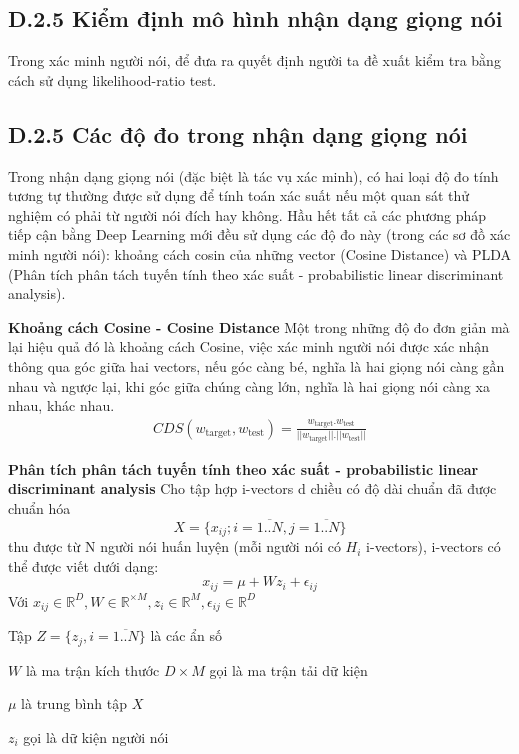 \documentclass{article}
\begin{document}
	\subsection{D.2.5 Kiểm định mô hình nhận dạng giọng nói}
	Trong xác minh người nói, để đưa ra quyết định người ta đề xuất kiểm tra bằng cách sử dụng likelihood-ratio test.

	\subsection{D.2.5 Các độ đo trong nhận dạng giọng nói}
	
	Trong nhận dạng giọng nói (đặc biệt là tác vụ xác minh), có hai loại độ đo tính tương tự thường được sử dụng để tính toán xác suất nếu một quan sát thử nghiệm có phải từ người nói đích hay không. Hầu hết tất cả các phương pháp tiếp cận bằng Deep Learning mới đều sử dụng các độ đo này (trong các sơ đồ xác minh người nói): khoảng cách cosin của những vector (Cosine Distance) và PLDA (Phân tích phân tách tuyến tính theo xác suất - probabilistic linear discriminant analysis).
	
	\textbf{Khoảng cách Cosine - Cosine Distance}
	Một trong những độ đo đơn giản mà lại hiệu quả đó là khoảng cách Cosine, việc xác minh người nói được xác nhận thông qua góc giữa hai vectors, nếu góc càng bé, nghĩa là hai giọng nói càng gần nhau và ngược lại, khi góc giữa chúng càng lớn, nghĩa là hai giọng nói càng xa nhau, khác nhau.
	\begin{align*}
		CDS(w_{\text{target}}, w_{\text{test}}) = \frac{w_{\text{target}}.w_{\text{test}}}{||w_{\text{target}}||.||w_{\text{test}}||}
	\end{align*}
	
	\textbf{Phân tích phân tách tuyến tính theo xác suất - probabilistic linear discriminant analysis}
	Cho tập hợp i-vectors d chiều có độ dài chuẩn đã được chuẩn hóa 
	$$X = \{x_{ij}; i = \overline{1..N}, j = \overline{1..N}\}$$ thu được từ N người nói huấn luyện (mỗi người nói có $H_{i}$ i-vectors), i-vectors có thể được viết dưới dạng:
	$$x_{ij} = \mu + Wz_{i} + \epsilon_{ij}$$
	Với $x_{ij} \in \mathbb{R}^{D}, W \in \mathbb{R}^{ \times M}, z_{i} \in \mathbb{R}^{M}, \epsilon_{ij} \in \mathbb{R}^{D}$
	
	Tập $Z=\{z_{j}, i = \overline{1..N}\}$ là các ẩn số
	
	$W$ là ma trận kích thước $D \times M$ gọi là ma trận tải dữ kiện
	
	$\mu$ là trung bình tập $X$
	
	$z_{i}$ gọi là dữ kiện người nói
	
\end{document}
